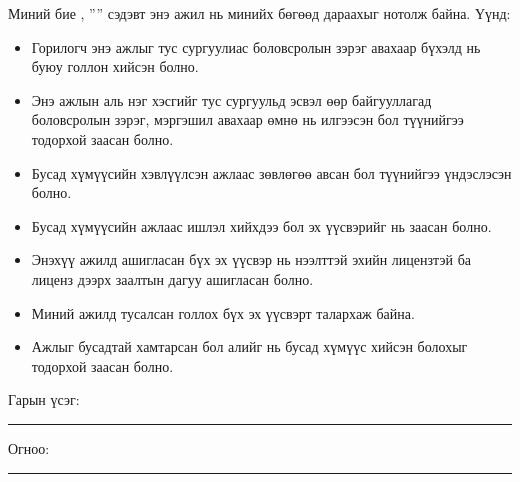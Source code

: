 \begin{declaration}
\addchaptertocentry{\authorshipname}

\noindent Миний бие \shortname, ''{\ttitle}'' сэдэвт энэ ажил нь минийх бөгөөд дараахыг нотолж байна. Үүнд:

\begin{itemize} 
\item Горилогч энэ ажлыг тус сургуулиас боловсролын зэрэг авахаар бүхэлд нь буюу голлон хийсэн болно.
\item Энэ ажлын аль нэг хэсгийг тус сургуульд эсвэл өөр байгууллагад боловсролын зэрэг, мэргэшил авахаар өмнө нь илгээсэн бол түүнийгээ тодорхой заасан болно.
\item Бусад хүмүүсийн хэвлүүлсэн ажлаас зөвлөгөө авсан бол түүнийгээ үндэслэсэн болно.
\item Бусад хүмүүсийн ажлаас ишлэл хийхдээ бол эх үүсвэрийг нь заасан болно.
\item Энэхүү ажилд ашигласан бүх эх үүсвэр нь нээлттэй эхийн лицензтэй ба лиценз дээрх заалтын дагуу ашигласан болно.
\item Миний ажилд тусалсан голлох бүх эх үүсвэрт талархаж байна.
\item Ажлыг бусадтай хамтарсан бол алийг нь бусад хүмүүс хийсэн болохыг тодорхой заасан болно.
\end{itemize}
\bigskip
 
\noindent Гарын үсэг: \rule[-0.5em]{12.7em}{0.5pt}
\bigskip

\noindent Огноо: \rule[-0.5em]{15em}{0.5pt}

\end{declaration}

\clearpage

